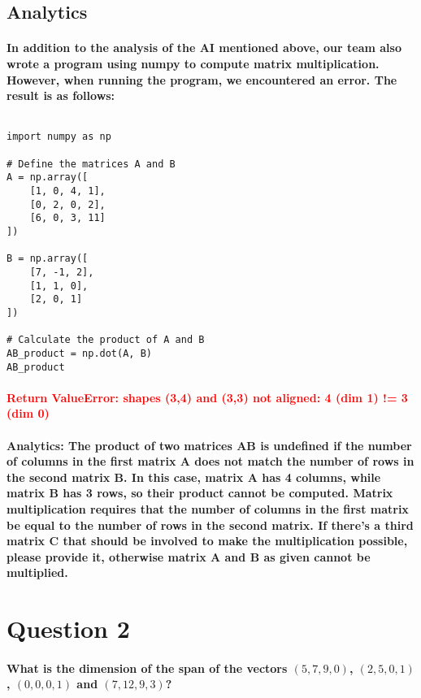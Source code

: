 \documentclass[11pt]{article} %
\begin{document}
\subsection{Analytics}
% 
% 
\paragraph{In addition to the analysis of the AI mentioned above, our team also wrote a program using numpy to compute matrix multiplication. However, when running the program, we encountered an error. The result is as follows:}
% 
% 
% 
% 
$$$$
% 
% 
\begin{lstlisting}[style=pystyle]
import numpy as np

# Define the matrices A and B
A = np.array([
    [1, 0, 4, 1],
    [0, 2, 0, 2],
    [6, 0, 3, 11]
])

B = np.array([
    [7, -1, 2],
    [1, 1, 0],
    [2, 0, 1]
])

# Calculate the product of A and B
AB_product = np.dot(A, B)
AB_product    
\end{lstlisting}
% 
% 
% 
% 
\paragraph{\textcolor{red}{Return ValueError: shapes (3,4) and (3,3) not aligned: 4 (dim 1) != 3 (dim 0)}}
% 
% 
\paragraph{\textbf{Analytics:} The product of two matrices AB is undefined if the number of columns in the first matrix A does not match the number of rows in the second matrix B. In this case, matrix A has 4 columns, while matrix B has 3 rows, so their product cannot be computed. Matrix multiplication requires that the number of columns in the first matrix be equal to the number of rows in the second matrix. If there's a third matrix C that should be involved to make the multiplication possible, please provide it, otherwise matrix A and B as given cannot be multiplied.}
% 
% 
% 
% 
% 
% 
% 
% 
% 
% 
% 
% 
% 
% 
\section{Question 2}
\paragraph{What is the dimension of the span of the vectors $(5,7,9,0)$, $(2,5,0,1)$, $(0,0,0,1)$ and $(7,12,9,3)$?}
% 
% 
% 
% 
% 
% 
\end{document}
